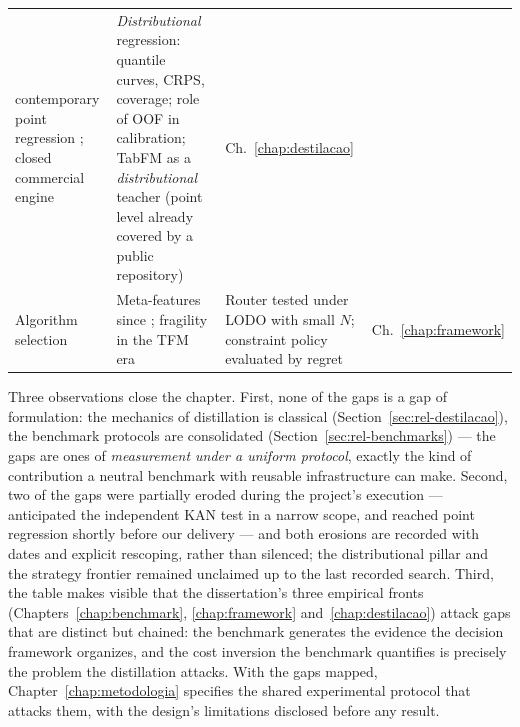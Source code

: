 \begin{table}[htbp]
\begin{tabular}{>{\raggedright\arraybackslash}p{}>{\raggedright\arraybackslash}p{}>{\raggedright\arraybackslash}p{}>{\raggedright\arraybackslash}p{}}
contemporary point regression \citep{jeong2026}; closed commercial
engine \citep{priorlabs2025} &
\emph{Distributional} regression: quantile curves, CRPS, coverage;
role of OOF in calibration; TabFM as a \emph{distributional} teacher
(point level already covered by a public repository) &
Ch.~\ref{chap:destilacao} \\
\addlinespace
Algorithm selection &
Meta-features since \citet{rice1976}; fragility in the TFM era
\citep{herre2026} &
Router tested under LODO with small $N$; constraint policy
evaluated by regret &
Ch.~\ref{chap:framework} \\
\bottomrule
\end{tabular}
\end{table}

Three observations close the chapter. First, none of the gaps is a
gap of formulation: the mechanics of distillation is classical
(Section~\ref{sec:rel-destilacao}), the benchmark protocols are
consolidated (Section~\ref{sec:rel-benchmarks}) --- the gaps are
ones of \emph{measurement under a uniform protocol}, exactly the
kind of contribution a neutral benchmark with reusable
infrastructure can make. Second, two of the gaps were partially
eroded during the project's execution --- \citet{poeta2024}
anticipated the independent KAN test in a narrow scope, and
\citet{jeong2026} reached point regression shortly before our delivery
--- and both erosions are recorded with dates and explicit
rescoping, rather than silenced; the distributional pillar and the
strategy frontier remained unclaimed up to the last recorded
search. Third, the table makes visible that the dissertation's
three empirical fronts (Chapters~\ref{chap:benchmark},
\ref{chap:framework} and~\ref{chap:destilacao}) attack gaps that
are distinct but chained: the benchmark generates the evidence the
decision framework organizes, and the cost inversion the benchmark
quantifies is precisely the problem the distillation attacks. With
the gaps mapped, Chapter~\ref{chap:metodologia} specifies the
shared experimental protocol that attacks them, with the design's
limitations disclosed before any result.
